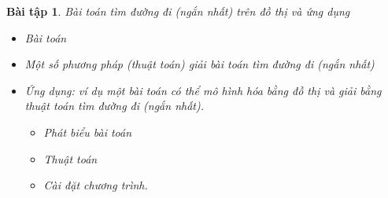 \documentclass[14pt, a4paper]{article}
\theoremstyle{sltheorem}
\newtheorem{baitap}{Bài tập}
\theoremstyle{soltheorem}
\begin{document}
    \begin{baitap}
        Bài toán tìm đường đi (ngắn nhất) trên đồ thị và ứng dụng

        \begin{itemize}
            \item Bài toán
            \item Một số phương pháp (thuật toán) giải bài toán tìm đường đi (ngắn nhất)
            \item Ứng dụng: ví dụ một bài toán có thể mô hình hóa bằng đồ thị và giải bằng
            thuật toán tìm đường đi (ngắn nhất).
            \begin{itemize}
                \item Phát biểu bài toán
                \item Thuật toán
                \item Cài đặt chương trình.
            \end{itemize}
        \end{itemize}
    \end{baitap}
\end{document}
